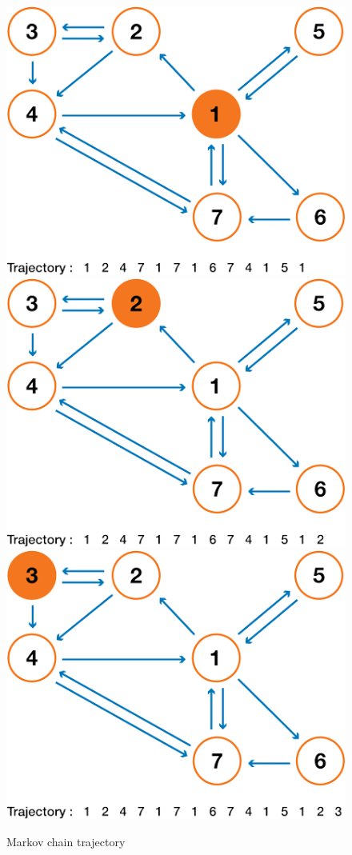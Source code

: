 \begin{figure}[h]
\includegraphics[width=.3\textwidth]{pic/p05c07-snip10-12.png}
\includegraphics[width=.3\textwidth]{pic/p05c07-snip10-13.png}
\includegraphics[width=.3\textwidth]{pic/p05c07-snip10-14.png}
    \caption{Markov chain trajectory}
    \label{fig:p05c07-snip10}
\end{figure}

\FloatBarrier


